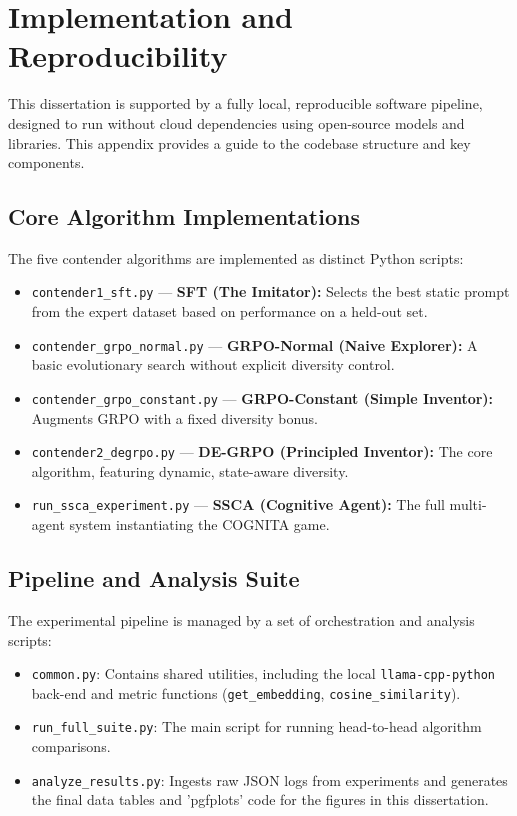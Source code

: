 \chapter{Implementation and Reproducibility}
\label{app:implementation}

This dissertation is supported by a fully local, reproducible software pipeline, designed to run without cloud dependencies using open-source models and libraries. This appendix provides a guide to the codebase structure and key components.

\section{Core Algorithm Implementations}
The five contender algorithms are implemented as distinct Python scripts:

\begin{itemize}[leftmargin=*]
    \item \texttt{contender1\_sft.py} --- \textbf{SFT (The Imitator):} Selects the best static prompt from the expert dataset based on performance on a held-out set.
    \item \texttt{contender\_grpo\_normal.py} --- \textbf{GRPO-Normal (Naive Explorer):} A basic evolutionary search without explicit diversity control.
    \item \texttt{contender\_grpo\_constant.py} --- \textbf{GRPO-Constant (Simple Inventor):} Augments GRPO with a fixed diversity bonus.
    \item \texttt{contender2\_degrpo.py} --- \textbf{DE-GRPO (Principled Inventor):} The core algorithm, featuring dynamic, state-aware diversity.
    \item \texttt{run\_ssca\_experiment.py} --- \textbf{SSCA (Cognitive Agent):} The full multi-agent system instantiating the COGNITA game.
\end{itemize}

\section{Pipeline and Analysis Suite}
The experimental pipeline is managed by a set of orchestration and analysis scripts:

\begin{itemize}[leftmargin=*]
    \item \texttt{common.py}: Contains shared utilities, including the local \texttt{llama-cpp-python} back-end and metric functions (\texttt{get\_embedding}, \texttt{cosine\_similarity}).
    \item \texttt{run\_full\_suite.py}: The main script for running head-to-head algorithm comparisons.
    \item \texttt{analyze\_results.py}: Ingests raw JSON logs from experiments and generates the final data tables and 'pgfplots' code for the figures in this dissertation.
\end{itemize}

